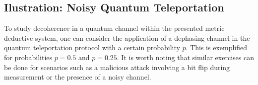 \subsection{Ilustration: Noisy Quantum Teleportation}

\vspace{0pt}

To study decoherence in a quantum channel within the presented metric deductive system, one can consider the application of a dephasing channel in the quantum teleportation protocol with a certain probability $p$. This is exemplified for probabilities $p=0.5$ and $p=0.25$. It is worth noting that similar exercises can be done for scenarios such as a malicious attack involving a bit flip during measurement or the presence of a noisy channel.